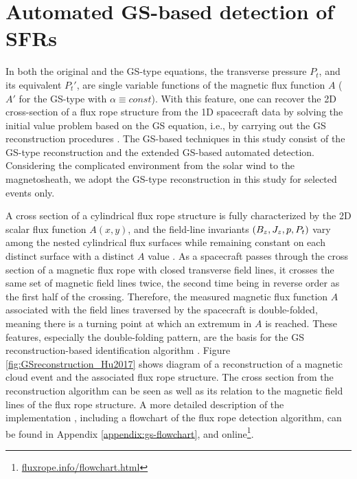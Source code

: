 \section{Automated GS-based detection of SFRs}\label{sec:GS-detection}
In both the original and the GS-type equations, the transverse pressure $P_t$, and its equivalent $P_t'$, are single variable functions of the magnetic flux function $A$ ($A'$ for the GS-type with $\alpha\equiv const$). With this feature, one can recover the 2D cross-section of a flux rope structure from the 1D spacecraft data by solving the initial value problem based on the GS equation, i.e., by carrying out the GS reconstruction procedures \citep{Hau:1999, HuSonnerup:2002, Hu:2017}. The GS-based techniques in this study consist of the GS-type reconstruction and the extended GS-based automated detection. Considering the complicated environment from the solar wind to the magnetosheath, we adopt the GS-type reconstruction in this study for selected events only.

A cross section of a cylindrical flux rope structure is fully characterized by the 2D scalar flux function $A(x, y)$, and the field-line invariants $\left( B_z,J_z,p, P_t \right)$ vary among the nested cylindrical flux surfaces while remaining constant on each distinct surface with a distinct $A$ value \citep{Hu:2018}. As a spacecraft passes through the cross section of a magnetic flux rope with closed transverse field lines, it crosses the same set of magnetic field lines twice, the second time being in reverse order as the first half of the crossing. Therefore, the measured magnetic flux function $A$ associated with the field lines traversed by the spacecraft is double-folded, meaning there is a turning point at which an extremum in $A$ is reached. These features, especially the double-folding pattern, are the basis for the GS reconstruction-based identification algorithm \citep{Hu:2018}. Figure \ref{fig:GSreconstruction_Hu2017} shows diagram of a reconstruction of a magnetic cloud event and the associated flux rope structure. The cross section from the reconstruction algorithm can be seen as well as its relation to the magnetic field lines of the flux rope structure. A more detailed description of the implementation \citep{Hu:2018}, including a flowchart of the flux rope detection algorithm, can be found in Appendix \ref{appendix:gs-flowchart}, and online\footnote{\url{fluxrope.info/flowchart.html}}.

